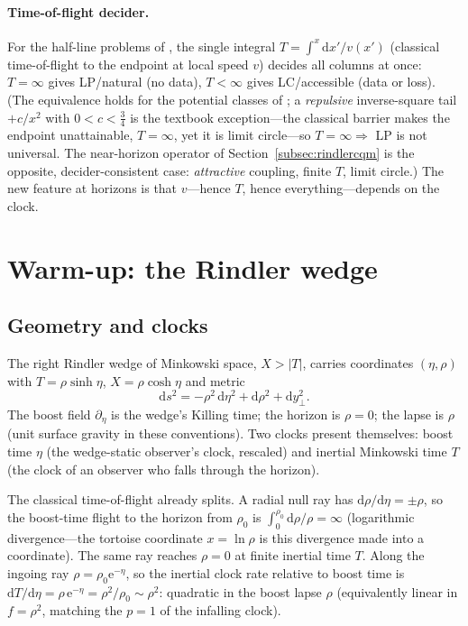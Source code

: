 \documentclass[11pt]{article}
\theoremstyle{definition}
\theoremstyle{remark}
\newcommand{\ee}{\mathrm{e}}
\newcommand{\dd}{\mathrm{d}}
\begin{document}
\paragraph{Time-of-flight decider.} For the half-line problems of
\cite{indivisible}, the single integral $T=\int^{x}\dd x'/v(x')$
(classical time-of-flight to the endpoint at local speed $v$) decides
all columns at once: $T=\infty$ gives LP/natural (no data), $T<\infty$
gives LC/accessible (data or loss). (The equivalence holds for the
potential classes of \cite{indivisible}; a \emph{repulsive}
inverse-square tail $+c/x^{2}$ with $0<c<\tfrac34$ is the textbook
exception---the classical barrier makes the endpoint unattainable,
$T=\infty$, yet it is limit circle---so $T=\infty\Rightarrow$ LP is not
universal. The near-horizon operator of
Section~\ref{subsec:rindlercqm} is the opposite, decider-consistent
case: \emph{attractive} coupling, finite $T$, limit circle.) The new
feature at horizons is
that $v$---hence $T$, hence everything---depends on the clock.

\section{Warm-up: the Rindler wedge}
\label{sec:rindler}

\subsection{Geometry and clocks}

The right Rindler wedge of Minkowski space, $X>|T|$, carries
coordinates $(\eta,\rho)$ with $T=\rho\sinh\eta$, $X=\rho\cosh\eta$
and metric
\begin{equation}
\dd s^{2}=-\rho^{2}\,\dd\eta^{2}+\dd\rho^{2}+\dd y_{\perp}^{2}.
\end{equation}
The boost field $\partial_{\eta}$ is the wedge's Killing time; the
horizon is $\rho=0$; the lapse is $\rho$ (unit surface gravity in
these conventions). Two clocks present themselves: boost time $\eta$
(the wedge-static observer's clock, rescaled) and inertial Minkowski
time $T$ (the clock of an observer who falls through the horizon).

The classical time-of-flight already splits. A radial null ray has
$\dd\rho/\dd\eta=\pm\rho$, so the boost-time flight to the horizon
from $\rho_{0}$ is $\int_{0}^{\rho_{0}}\dd\rho/\rho=\infty$
(logarithmic divergence---the tortoise coordinate $x=\ln\rho$ is this
divergence made into a coordinate). The same ray reaches $\rho=0$ at
finite inertial time $T$. Along the ingoing ray $\rho=\rho_{0}\ee^{-\eta}$,
so the inertial clock rate relative to boost time is
$\dd T/\dd\eta=\rho\,\ee^{-\eta}=\rho^{2}/\rho_{0}\sim\rho^{2}$:
quadratic in the boost lapse $\rho$ (equivalently linear in $f=\rho^{2}$,
matching the $p=1$ of the infalling clock).
\end{document}
